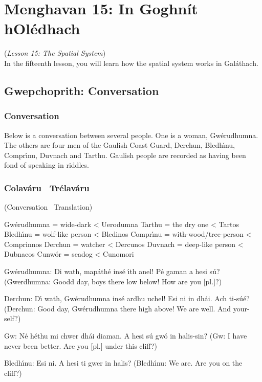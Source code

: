 \section{Menghavan 15: In Goghn\'{i}t hOl\'{e}dhach}
(\textit{Lesson 15: The Spatial System})\\

In the fifteenth lesson, you will learn how the spatial system works in Gal\'{a}thach.

\subsection{Gwepchoprith: Conversation}

\subsubsection{Conversation}

Below is a conversation between several people. One is a woman, Gw\'{e}rudhumna. The others are four men of the Gaulish Coast Guard, Derchun, Bledh\'{\i}nu, Compr\'{\i}nu, Duvnach and Tarthu. Gaulish people are recorded as having been fond of speaking in riddles.


\subsubsection{Colav\'{a}ru \textendash\ Tr\'{e}lav\'{a}ru}
(Conversation \textendash\ Translation)

Gw\'{e}rudhumna = wide-dark < Uerodumna
Tarthu = the dry one < Tartos
Bledh\'{\i}nu = wolf-like person < Bledinos
Compr\'{\i}nu = with-wood/tree-person < Comprinnos
Derchun = watcher < Dercunos
Duvnach = deep-like person < Dubnacos
Cunw\'{o}r = seadog < Cunomori

Gw\'{e}rudhumna: Di wath, map\'{a}th\'{e} ins\'{e} \'{\i}th anel! P\'{e} gaman a hesi s\'{u}?
(Gwerdhumna: Goodd day, boys there low below! How are you [pl.]?)

Derchun: D\'{\i} wath, Gw\'{e}rudhumna ins\'{e} ardhu uchel! Esi ni in dh\'{a}i. Ach ti-s\'{u}\'{e}?
(Derchun: Good day, Gw\'{e}rudhumna there high above! We are well. And your-self?)

Gw: N\'{e} h\'{e}thu mi chwer dh\'{a}i diaman. A hesi s\'{u} gw\'{o} in halis-sin?
(Gw: I have never been better. Are you [pl.] under this cliff?)

Bledh\'{\i}nu: Esi ni. A hesi ti gwer in halis?
(Bledh\'{\i}nu: We are. Are you on the cliff?)

